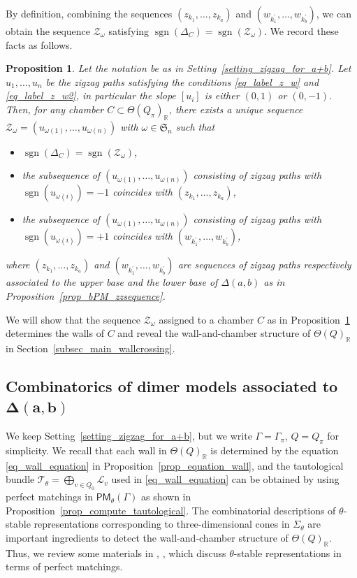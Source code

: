 \documentclass[pdftex]{sigma}
\numberwithin{equation}{section}
\newtheorem{Proposition}[Theorem]{Proposition}
\theoremstyle{definition}
\newcommand{\RR}{\mathbb{R}}
\newcommand{\calL}{\mathcal{L}}
\newcommand{\calT}{\mathcal{T}}
\newcommand{\calZ}{\mathcal{Z}}
\newcommand{\fkS}{\mathfrak{S}}
\newcommand{\sgn}{\operatorname{sgn}}
\newcommand{\PM}{\mathsf{PM}}
\newcommand{\perm}{\pi}
\newcommand{\permII}{\omega}
\begin{document}
By definition, combining the sequences $(z_{k_1}, \dots, z_{k_a})$ and $(w_{k^\prime_1}, \dots, w_{k^\prime_b})$,
we can obtain the sequence $\calZ_\permII$ satisfying $\sgn(\Delta_C)=\sgn(\calZ_\permII)$.
We record these facts as follows.

\begin{Proposition}
\label{prop_chamber_correspond_zigzag}
Let the notation be as in Setting~{\rm \ref{setting_zigzag_for_a+b}}.
Let $u_1, \dots, u_n$ be the zigzag paths satisfying the conditions \eqref{eq_label_z_w} and \eqref{eq_label_z_w2},
in particular the slope $[u_i]$ is either $(0,1)$ or $(0,-1)$.
Then, for any chamber $C\subset\Theta(Q_\perm)_\RR$, there exists a unique sequence
$\calZ_\permII=(u_{\permII(1)}, \dots, u_{\permII(n)})$ with $\permII\in\fkS_n$ such that
\begin{itemize}\itemsep=0pt
\item[\rm (a)] $\sgn(\Delta_C)=\sgn(\calZ_\permII)$,
\item[\rm (b)] the subsequence of $(u_{\permII(1)}, \dots, u_{\permII(n)})$ consisting of zigzag paths with $\sgn(u_{\permII(i)})=-1$
coincides with $(z_{k_1},\dots, z_{k_a})$,
\item[\rm (c)] the subsequence of $(u_{\permII(1)}, \dots, u_{\permII(n)})$ consisting of zigzag paths with $\sgn(u_{\permII(i)})=+1$
coincides with $(w_{k^\prime_1}, \dots, w_{k^\prime_b})$,
\end{itemize}
where $(z_{k_1},\dots, z_{k_a})$ and $(w_{k^\prime_1}, \dots, w_{k^\prime_b})$ are sequences of zigzag paths respectively
associated to the upper base and the lower base of $\Delta(a,b)$ as in Proposition~{\rm \ref{prop_bPM_zzsequence}}.
\end{Proposition}

We will show that the sequence $\calZ_\permII$ assigned to a chamber $C$ as in Proposition~\ref{prop_chamber_correspond_zigzag}
determines the walls of $C$ and reveal the wall-and-chamber structure of $\Theta(Q)_\RR$ in Section~\ref{subsec_main_wallcrossing}.

\subsection[Combinatorics of dimer models associated to Delta(a,b)]{Combinatorics of dimer models associated to $\boldsymbol{\Delta(a,b)}$}
\label{subsec_jigsaw}

We keep Setting~\ref{setting_zigzag_for_a+b}, but we write $\Gamma=\Gamma_\perm$, $Q=Q_\perm$ for simplicity.
We recall that each wall in $\Theta(Q)_\RR$ is determined by the equation \eqref{eq_wall_equation} in Proposition~\ref{prop_equation_wall},
and the tautological bundle $\calT_\theta=\bigoplus_{v\in Q_0}\calL_v$ used in \eqref{eq_wall_equation} can be obtained by using
perfect matchings in $\PM_\theta(\Gamma)$ as shown in Proposition~\ref{prop_compute_tautological}.
The combinatorial descriptions of $\theta$-stable representations corresponding to three-dimensional cones in $\Sigma_\theta$
are important ingredients to detect the wall-and-chamber structure of $\Theta(Q)_\RR$.
Thus, we review some materials in \cite[Section~4]{IU_moduli}, \cite[Section~4]{Moz}, \cite[Section~3]{CHT} which discuss
$\theta$-stable representations in terms of perfect matchings.
\end{document}
